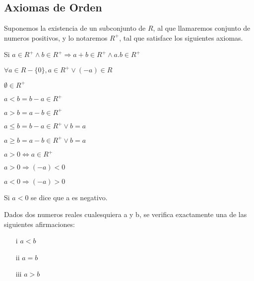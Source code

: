 \documentclass[10pt]{article}
\begin{document}
\subsection{Axiomas de Orden}
Suponemos la existencia de un subconjunto de $R$, al que llamaremos conjunto de numeros positivos, y lo notaremos $R^+$, tal que satisface los siguientes axiomas.

\begin{axiom}{}
Si $a \in R^+ \land b \in R^+ \Rightarrow a+b \in R^+ \land a.b \in R^+$
\end{axiom}

\begin{axiom}{}
$\forall a \in R-\{0\}, a \in R^+ \lor (-a) \in R$
\end{axiom}

\begin{axiom}{}
$\emptyset \in R^+$
\end{axiom}

\begin{data}{}
\begin{itemize}
\begin{multicols}{2}
\item $a < b = b - a \in R^+$
\item $a > b = a - b \in R^+$
\item $a \leq b = b - a \in R^+ \lor b=a$
\item $a \geq b = a - b \in R^+ \lor b=a$
\item $a > 0 \iff a \in R^+$
\item $a > 0 \Rightarrow (-a) < 0$
\item $a < 0 \Rightarrow (-a) > 0$
\end{multicols}
Si $a<0$ se dice que a es negativo.
\end{itemize}
\end{data}

\begin{theo}{}
Dados dos numeros reales cualesquiera a y b, se verifica exactamente una de las siguientes afirmaciones:
\begin{multicols}{3}
\begin{enumerate}
\item [i] $a < b$
\item [ii] $ a = b$
\item [iii] $a > b$
\end{enumerate}
\end{multicols}
\end{theo}
\end{document}
